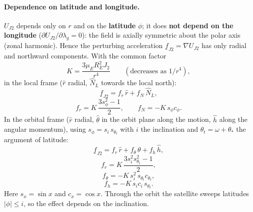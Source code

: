 \paragraph{Dependence on latitude and longitude.} $U_{J2}$ depends only on $r$ and on the \textbf{latitude} $\phi$; it does \textbf{not depend on the
longitude} ($\partial U_{J2}/\partial\lambda_g=0$): the field is axially symmetric about the polar axis (zonal harmonic). Hence
the perturbing acceleration $\underline f_{J2}=\nabla U_{J2}$ has only radial and northward components. With the common factor
\begin{equation}
K=\frac{3\mu_E R_E^2J_2}{r^4}\qquad(\text{decreases as }1/r^4),
\end{equation}
in the local frame ($\hat r$ radial, $\hat N_L$ towards the local north):
\begin{equation}
\underline f_{J2}=f_r\,\hat r+f_N\,\hat N_L,
\end{equation}
\begin{equation}
f_r=K\,\frac{3s_\phi^2-1}{2},\qquad f_N=-K\,s_\phi c_\phi .
\end{equation}
In the orbital frame ($\hat r$ radial, $\hat\theta$ in the orbit plane along the motion, $\hat h$ along the angular momentum), using
$s_\phi=s_i\,s_{\theta_t}$ with $i$ the inclination and $\theta_t=\omega+\theta_*$ the argument of latitude:
\begin{equation}
\underline f_{J2}=f_r\,\hat r+f_\theta\,\hat\theta+f_h\,\hat h,
\end{equation}
\begin{equation}
f_r=K\,\frac{3s_i^2s_{\theta_t}^2-1}{2},
\end{equation}
\begin{equation}
f_\theta=-K\,s_i^2\,s_{\theta_t}c_{\theta_t},
\end{equation}
\begin{equation}
f_h=-K\,s_i c_i\,s_{\theta_t}.
\end{equation}
Here $s_x=\sin x$ and $c_x=\cos x$. Through the orbit the satellite sweeps latitudes $|\phi|\le i$, so the effect depends on
the inclination.


